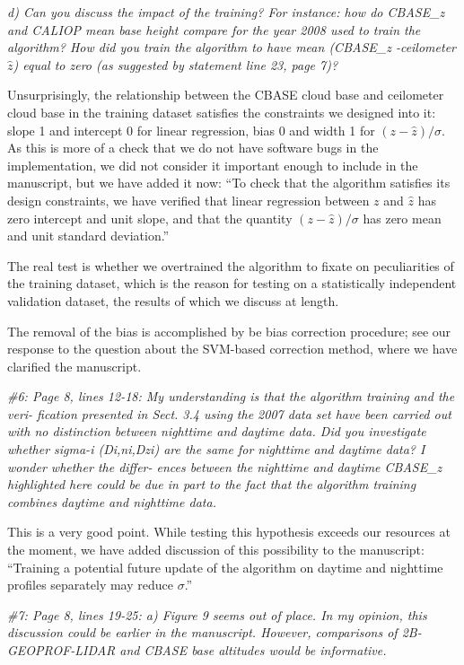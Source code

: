 \documentclass[12pt,a4paper]{responses}
\begin{document}
\textit{ d) Can you discuss the impact of the training? For instance: how do
  CBASE\_z and CALIOP mean base height compare for the year 2008 used to train
  the algorithm? How did you train the algorithm to have mean (CBASE\_z
  -ceilometer $\hat{z}$) equal to zero (as suggested by statement line 23, page
  7)?}

Unsurprisingly, the relationship between the CBASE cloud base and ceilometer
cloud base in the training dataset satisfies the constraints we designed into
it: slope 1 and intercept 0 for linear regression, bias 0 and width 1 for
$(z - \hat{z})/\sigma$.  As this is more of a check that we do not have software
bugs in the implementation, we did not consider it important enough to include
in the manuscript, but we have added it now: ``To check that the algorithm
satisfies its design constraints, we have verified that linear regression
between $z$ and $\hat{z}$ has zero intercept and unit slope, and that the
quantity $(z - \hat{z})/\sigma$ has zero mean and unit standard deviation.''


The real test is whether we overtrained the algorithm to fixate on peculiarities
of the training dataset, which is the reason for testing on a statistically
independent validation dataset, the results of which we discuss at length.

The removal of the bias is accomplished by be bias correction procedure; see our
response to the question about the SVM-based correction method, where we have
clarified the manuscript.

\textit{\#6: Page 8, lines 12-18: My understanding is that the algorithm
  training and the veri- fication presented in Sect.  3.4 using the 2007 data
  set have been carried out with no distinction between nighttime and daytime
  data.  Did you investigate whether sigma-i (Di,ni,Dzi) are the same for
  nighttime and daytime data?  I wonder whether the differ- ences between the
  nighttime and daytime CBASE\_z highlighted here could be due in part to the
  fact that the algorithm training combines daytime and nighttime data.}

This is a very good point.  While testing this hypothesis exceeds our resources
at the moment, we have added discussion of this possibility to the manuscript:
``Training a potential future update of the algorithm
on daytime and nighttime profiles separately may reduce $\sigma$.''

\textit{\#7: Page 8, lines 19-25: a) Figure 9 seems out of place. In my opinion, this discussion
could be earlier in the manuscript.   However,  comparisons of 2B-GEOPROF-LIDAR
and CBASE base altitudes would be informative.}
\end{document}
